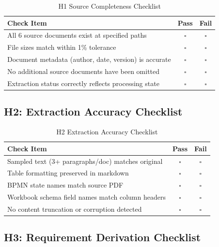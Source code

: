\begin{table}[h]
\centering
\caption{H1 Source Completeness Checklist}
\begin{tabular}{@{}L{10cm}cc@{}}
\toprule
\textbf{Check Item} & \textbf{Pass} & \textbf{Fail} \\
\midrule
All 6 source documents exist at specified paths & $\square$ & $\square$ \\
File sizes match within 1\% tolerance & $\square$ & $\square$ \\
Document metadata (author, date, version) is accurate & $\square$ & $\square$ \\
No additional source documents have been omitted & $\square$ & $\square$ \\
Extraction status correctly reflects processing state & $\square$ & $\square$ \\
\bottomrule
\end{tabular}
\end{table}

\subsection{H2: Extraction Accuracy Checklist}

\begin{table}[h]
\centering
\caption{H2 Extraction Accuracy Checklist}
\begin{tabular}{@{}L{10cm}cc@{}}
\toprule
\textbf{Check Item} & \textbf{Pass} & \textbf{Fail} \\
\midrule
Sampled text (3+ paragraphs/doc) matches original & $\square$ & $\square$ \\
Table formatting preserved in markdown & $\square$ & $\square$ \\
BPMN state names match source PDF & $\square$ & $\square$ \\
Workbook schema field names match column headers & $\square$ & $\square$ \\
No content truncation or corruption detected & $\square$ & $\square$ \\
\bottomrule
\end{tabular}
\end{table}

\subsection{H3: Requirement Derivation Checklist}

